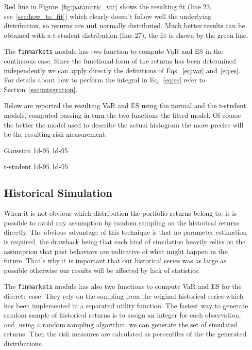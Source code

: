 Red line in Figure~\ref{fig:paramtric_var} shows the resulting fit (line 23, see~\ref{sec:how_to_fit}) which clearly doesn't follow well the underlying distribution, so returns are \textbf{not} normally distributed. Much better results can be obtained with a t-student distribution (line 27), the fit is shown by the green line. 

\begin{finmarkets}
The \texttt{finmarkets} module has two function to compute VaR and ES in the continuous case. Since the functional form of the returns has been determined independently we can apply directly the definitions of  Eqs.~\ref{eq:var} and~\ref{eq:es}. 
For details about how to perform the integral in Eq.~\ref{eq:es} refer to Section~\ref{sec:integration}.
\end{finmarkets}

Below are reported the resulting VaR and ES using the normal and the t-student models, computed passing in turn the two functions the fitted model. Of course the better the model used to describe the actual histogram the more precise will be the resulting risk measurement.
  
\begin{ioutput}
Gaussian
1d-95%
1d-95%

t-student
1d-95%
1d-95%
\end{ioutput}

\subsection{Historical Simulation}
\label{historical-simulation}

When it is not obvious which distribution the portfolio returns belong to, it is possible to avoid any assumption by random sampling on the historical returns directly. The obvious advantage of this technique is that no parameter estimation is required, the drawback being that such kind of simulation heavily relies on the assumption that past behaviors are indicative of what might happen in the future. That's why it is important that out historical series was as large as possible otherwise our results will be affected by lack of statistics. 

\begin{finmarkets}
The \texttt{finmarkets} module has also two functions to compute VaR and ES for the discrete case. They rely on the sampling from the original historical series which has been implemented in a separated utility function. The fastest way to generate random sample of historical returns is to assign an integer for each observation, and, using a random sampling algorithm, we can generate the set of simulated returns. Then the risk measures are calculated as percentiles of the the generated distributions.
\end{finmarkets}

